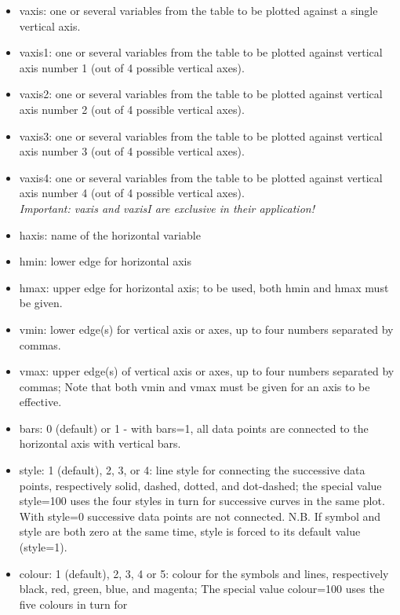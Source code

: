 \begin{itemize}
   \item vaxis: one or several variables from the table to be plotted
     against a single vertical axis.   
   \item vaxis1: one or several variables from the table to be plotted
     against vertical axis number 1 (out of 4 possible vertical axes).  
   \item vaxis2: one or several variables from the table to be plotted
     against vertical axis number 2 (out of 4 possible vertical axes).  
   \item vaxis3: one or several variables from the table to be plotted
     against vertical axis number 3 (out of 4 possible vertical axes).  
   \item vaxis4: one or several variables from the table to be plotted
     against vertical axis number 4 (out of 4 possible vertical axes). \\ 
   \textit{Important: vaxis and vaxisI are exclusive in their
     application!} 
   \item haxis: name of the horizontal variable 
   \item hmin: lower edge for horizontal axis 
   \item hmax: upper edge for horizontal axis; to be used, both hmin and hmax
     must be given.   
   \item vmin: lower edge(s) for vertical axis or axes, up to four
     numbers separated by commas.
   \item vmax: upper edge(s) of vertical axis or axes, up to four
     numbers separated by commas; 
     Note that both vmin and vmax must be given for an axis to be effective.   
   \item bars: 0 (default) or 1 - with bars=1, all data points
     are connected to the horizontal axis with vertical bars.   
   \item style: 1 (default), 2, 3, or 4: line style for connecting the
     successive data points, respectively solid, dashed, dotted, and dot-dashed; 
     the special value style=100 uses the four styles in turn for
     successive curves in the same plot. 
     With style=0 successive data points are not connected. 
     N.B. If symbol and style are both zero at the same time, style is
     forced to its default value (style=1).
   \item colour: 1 (default), 2, 3, 4 or 5: colour for the symbols and lines, 
     respectively black, red, green, blue, and magenta; 
     The special value colour=100  uses the five colours in turn for

\end{itemize}
